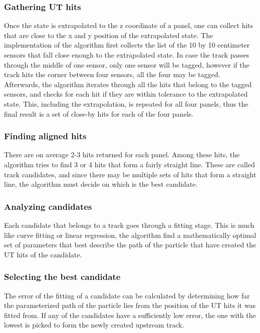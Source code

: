 \documentclass[12pt]{article}
\begin{document}
\subsubsection{Gathering UT hits}

Once the state is extrapolated to the z coordinate of a panel, one can collect hits that are close to the x and y position of the extrapolated state. The implementation of the algorithm first collects the list of the 10 by 10 centimeter sensors that fall close enough to the extrapolated state. In case the track passes through the middle of one sensor, only one sensor will be tagged, however if the track hits the corner between four sensors, all the four may be tagged. Afterwards, the algorithm iterates through all the hits that belong to the tagged sensors, and checks for each hit if they are within tolerance to the extrapolated state. This, including the extrapolation, is repeated for all four panels, thus the final result is a set of close-by hits for each of the four panels.

\subsubsection{Finding aligned hits}

There are on average 2-3 hits returned for each panel. Among these hits, the algorithm tries to find 3 or 4 hits that form a fairly straight line. These are called track candidates, and since there may be multiple sets of hits that form a straight line, the algorithm must decide on which is the best candidate.

\subsubsection{Analyzing candidates}

Each candidate that belongs to a track goes through a fitting stage. This is much like curve fitting or linear regression, the algorithm find a mathematically optimal set of parameters that best describe the path of the particle that have created the UT hits of the candidate. 

\subsubsection{Selecting the best candidate}

The error of the fitting of a candidate can be calculated by determining how far the parameterized path of the particle lies from the position of the UT hits it was fitted from. If any of the candidates have a sufficiently low error, the one with the lowest is picked to form the newly created upstream track.
\end{document}
